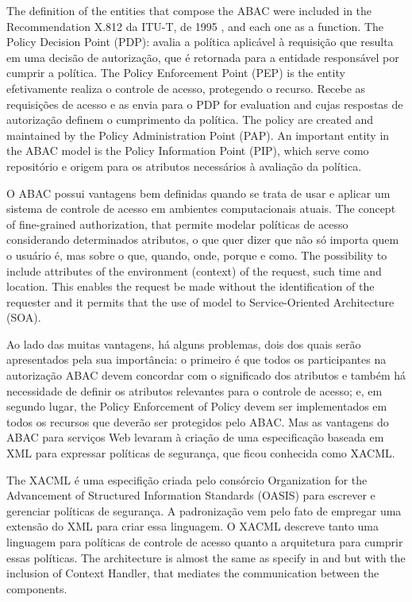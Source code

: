 \documentclass{doublecol-new}
\begin{document}
The definition of the entities that compose the ABAC were included in the Recommendation X.812 da ITU-T, de 1995 \citep{itut1996acframework}, and each one as a function. The Policy Decision Point (PDP): avalia a política aplicável à requisição que resulta em uma decisão de autorização, que é retornada para a entidade responsável por cumprir a política. The Policy Enforcement Point (PEP) is the entity efetivamente realiza o controle de acesso, protegendo o recurso. Recebe as requisições de acesso e as envia para o PDP for evaluation and cujas respostas de autorização definem o cumprimento da política. The policy are created and maintained by the Policy Administration Point (PAP). An important entity in the ABAC model is the Policy Information Point (PIP), which serve como repositório e origem para os atributos necessários à avaliação da política.

O ABAC possui vantagens bem definidas quando se trata de usar e aplicar um sistema de controle de acesso em ambientes computacionais atuais. The concept of fine-grained authorization, that permite modelar políticas de acesso considerando determinados atributos, o que quer dizer que não só importa quem o usuário é, mas sobre o que, quando, onde, porque e como. The possibility to include attributes of the environment (context) of the request, such time and location. This enables the request be made without the identification of the requester and it permits that the use of model to Service-Oriented Architecture (SOA).

Ao lado das muitas vantagens, há alguns problemas, dois dos quais serão apresentados pela sua importância: o primeiro é que todos os participantes na autorização ABAC devem concordar com o significado dos atributos \cite{karp2010abac} \cite{Rubio-Medrano2015federated} e também há necessidade de definir os atributos relevantes para o controle de acesso; e, em segundo lugar, the Policy Enforcement of Policy devem ser implementados em todos os recursos que deverão ser protegidos pelo ABAC. Mas as vantagens do ABAC para serviços Web levaram à criação de uma especificação baseada em XML para expressar políticas de segurança, que ficou conhecida como XACML.

The XACML é uma especifição criada pelo consórcio Organization for the Advancement of Structured Information Standards (OASIS) para escrever e gerenciar políticas de segurança. A padronização vem pelo fato de empregar uma extensão do XML para criar essa linguagem. O XACML descreve tanto uma linguagem para políticas de controle de acesso quanto a arquitetura para cumprir essas políticas. The architecture is almost the same as specify in \cite{huABAC2014guide} and \cite{itut1996acframework} but with the inclusion of Context Handler, that mediates the communication between the components.
\end{document}
